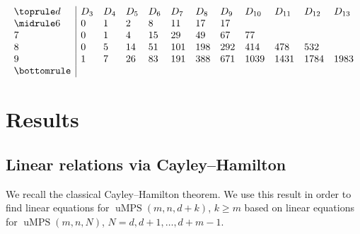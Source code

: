 \documentclass[10pt,a4paper]{amsart}
\numberwithin{equation}{section}
\DeclareMathOperator{\uMPS}{uMPS}
\begin{document}
 \begin{table}[th!]\centering
	\caption{Character of $I(\uMPS(2,2,d))^*_3$. Since $D_{w}=D_{3d-w}$, we only list $D_w$ for $w \leq \big\lceil \frac{3d}{2}\big\rceil$.}  \label{table:character3}

\vspace{-5mm}

$$
	\begin{array}{l|lllllllllll}
	\toprule
	d & D_3 & D_4 & D_5 & D_6 & D_7 & D_8 & D_9 & D_{10} & D_{11} & D_{12} & D_{13}\\
	\midrule
	6 & 0 & 1 &  2 &  8 &  11 &  17 &  17 &      &      &      &      \\
	7 & 0 & 1 &  4 & 15 &  29 &  49 &  67 &   77 &      &      &      \\
	8 & 0 & 5 & 14 & 51 & 101 & 198 & 292 &  414 & 478  & 532  &      \\
	9 & 1 & 7 & 26 & 83 & 191 & 388 & 671 & 1039 & 1431 & 1784 & 1983 \\
	\bottomrule
	\end{array}$$
\vspace{-2mm}
\end{table}

\section{Results} \label{sec:results}

 \subsection{Linear relations via Cayley--Hamilton} \label{sec:CH}
We recall the classical Cayley--Hamilton theorem.
We use this result in order to find linear equations for ${\uMPS(m,n,d+k)}$, $k\geq m$ based on linear equations for ${\uMPS(m,n,N)}$, $N=d,d+1,\dots,d+m-1$.
\end{document}
